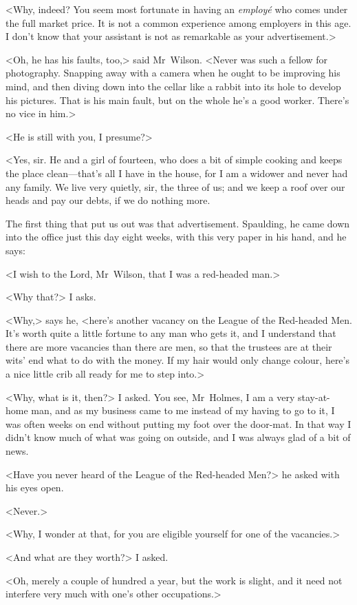 <Why, indeed? You seem most fortunate in having an \textit{employé} who comes under the full market price. It is not a common experience among employers in this age. I don't know that your assistant is not as remarkable as your advertisement.>

<Oh, he has his faults, too,> said Mr~Wilson. <Never was such a fellow for photography. Snapping away with a camera when he ought to be improving his mind, and then diving down into the cellar like a rabbit into its hole to develop his pictures. That is his main fault, but on the whole he's a good worker. There's no vice in him.>

<He is still with you, I presume?>

<Yes, sir. He and a girl of fourteen, who does a bit of simple cooking and keeps the place clean—that's all I have in the house, for I am a widower and never had any family. We live very quietly, sir, the three of us; and we keep a roof over our heads and pay our debts, if we do nothing more.

The first thing that put us out was that advertisement. Spaulding, he came down into the office just this day eight weeks, with this very paper in his hand, and he says:

<I wish to the Lord, Mr~Wilson, that I was a red-headed man.>

<Why that?> I asks.

<Why,> says he, <here's another vacancy on the League of the Red-headed Men. It's worth quite a little fortune to any man who gets it, and I understand that there are more vacancies than there are men, so that the trustees are at their wits' end what to do with the money. If my hair would only change colour, here's a nice little crib all ready for me to step into.>

<Why, what is it, then?> I asked. You see, Mr~Holmes, I am a very stay-at-home man, and as my business came to me instead of my having to go to it, I was often weeks on end without putting my foot over the door-mat. In that way I didn't know much of what was going on outside, and I was always glad of a bit of news.

<Have you never heard of the League of the Red-headed Men?> he asked with his eyes open.

<Never.>

<Why, I wonder at that, for you are eligible yourself for one of the vacancies.>

<And what are they worth?> I asked.

<Oh, merely a couple of hundred a year, but the work is slight, and it need not interfere very much with one's other occupations.>

